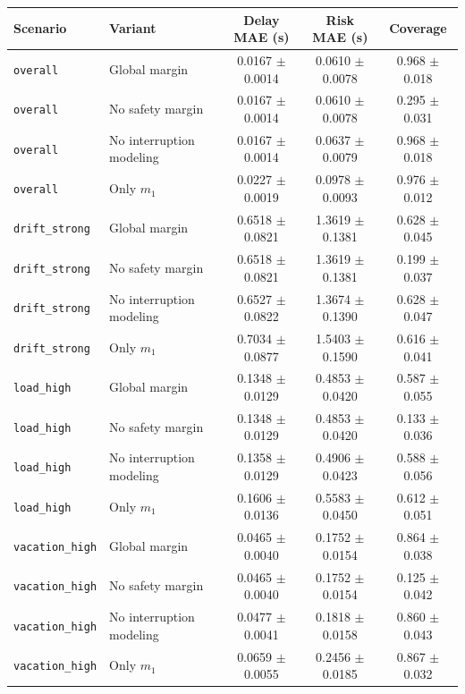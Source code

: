 \begin{tabular}{llccc}
\hline
Scenario & Variant & Delay MAE (s) & Risk MAE (s) & Coverage \\
\hline
\texttt{overall} & Global margin & 0.0167 $\pm$ 0.0014 & 0.0610 $\pm$ 0.0078 & 0.968 $\pm$ 0.018 \\
\texttt{overall} & No safety margin & 0.0167 $\pm$ 0.0014 & 0.0610 $\pm$ 0.0078 & 0.295 $\pm$ 0.031 \\
\texttt{overall} & No interruption modeling & 0.0167 $\pm$ 0.0014 & 0.0637 $\pm$ 0.0079 & 0.968 $\pm$ 0.018 \\
\texttt{overall} & Only $m_1$ & 0.0227 $\pm$ 0.0019 & 0.0978 $\pm$ 0.0093 & 0.976 $\pm$ 0.012 \\
\hline
\texttt{drift\_strong} & Global margin & 0.6518 $\pm$ 0.0821 & 1.3619 $\pm$ 0.1381 & 0.628 $\pm$ 0.045 \\
\texttt{drift\_strong} & No safety margin & 0.6518 $\pm$ 0.0821 & 1.3619 $\pm$ 0.1381 & 0.199 $\pm$ 0.037 \\
\texttt{drift\_strong} & No interruption modeling & 0.6527 $\pm$ 0.0822 & 1.3674 $\pm$ 0.1390 & 0.628 $\pm$ 0.047 \\
\texttt{drift\_strong} & Only $m_1$ & 0.7034 $\pm$ 0.0877 & 1.5403 $\pm$ 0.1590 & 0.616 $\pm$ 0.041 \\
\hline
\texttt{load\_high} & Global margin & 0.1348 $\pm$ 0.0129 & 0.4853 $\pm$ 0.0420 & 0.587 $\pm$ 0.055 \\
\texttt{load\_high} & No safety margin & 0.1348 $\pm$ 0.0129 & 0.4853 $\pm$ 0.0420 & 0.133 $\pm$ 0.036 \\
\texttt{load\_high} & No interruption modeling & 0.1358 $\pm$ 0.0129 & 0.4906 $\pm$ 0.0423 & 0.588 $\pm$ 0.056 \\
\texttt{load\_high} & Only $m_1$ & 0.1606 $\pm$ 0.0136 & 0.5583 $\pm$ 0.0450 & 0.612 $\pm$ 0.051 \\
\hline
\texttt{vacation\_high} & Global margin & 0.0465 $\pm$ 0.0040 & 0.1752 $\pm$ 0.0154 & 0.864 $\pm$ 0.038 \\
\texttt{vacation\_high} & No safety margin & 0.0465 $\pm$ 0.0040 & 0.1752 $\pm$ 0.0154 & 0.125 $\pm$ 0.042 \\
\texttt{vacation\_high} & No interruption modeling & 0.0477 $\pm$ 0.0041 & 0.1818 $\pm$ 0.0158 & 0.860 $\pm$ 0.043 \\
\texttt{vacation\_high} & Only $m_1$ & 0.0659 $\pm$ 0.0055 & 0.2456 $\pm$ 0.0185 & 0.867 $\pm$ 0.032 \\
\hline
\end{tabular}
